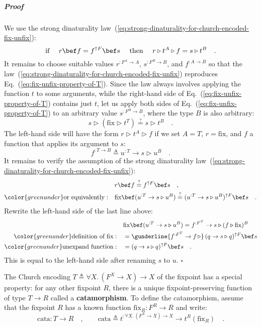 \subparagraph{Proof}

We use the strong dinaturality law~(\ref{eq:strong-dinaturality-for-church-encoded-fix-unfix}):
\[
\text{if }\quad r\bef f=f^{\uparrow F}\bef s\quad\text{ then }\quad r\triangleright t^{A}\triangleright f=s\triangleright t^{B}\quad.
\]
It remains to choose suitable values $r^{:F^{A}\rightarrow A}$, $s^{:F^{B}\rightarrow B}$,
and $f^{:A\rightarrow B}$ so that the law~(\ref{eq:strong-dinaturality-for-church-encoded-fix-unfix})
reproduces Eq.~(\ref{eq:fix-unfix-property-of-T}). Since the law
always involves applying the function $t$ to some arguments, while
the right-hand side of Eq.~(\ref{eq:fix-unfix-property-of-T}) contains
just $t$, let us apply both sides of Eq.~(\ref{eq:fix-unfix-property-of-T})
to an arbitrary value $s^{:F^{B}\rightarrow B}$, where the type $B$
is also arbitrary:
\[
s\triangleright(\text{fix}\triangleright t^{T})\overset{?}{=}s\triangleright t^{B}\quad.
\]
The left-hand side will have the form $r\triangleright t^{A}\triangleright f$
if we set $A=T$, $r=\text{fix}$, and $f$ a function that applies
its argument to $s$:
\[
f^{:T\rightarrow B}\triangleq u^{:T}\rightarrow s\triangleright u^{B}\quad.
\]
It remains to verify the assumption of the strong dinaturality law~(\ref{eq:strong-dinaturality-for-church-encoded-fix-unfix}):
\begin{align*}
 & r\bef f\overset{?}{=}f^{\uparrow F}\bef s\quad,\\
{\color{greenunder}\text{or equivalently}:}\quad & \text{fix}\bef(u^{:T}\rightarrow s\triangleright u^{B})\overset{?}{=}(u^{:T}\rightarrow s\triangleright u^{B})^{\uparrow F}\bef s\quad.
\end{align*}
Rewrite the left-hand side of the last line above:
\begin{align*}
 & \text{fix}\bef(u^{:T}\rightarrow s\triangleright u^{B})=f^{:F^{T}}\rightarrow s\triangleright(f\triangleright\text{fix})^{B}\\
{\color{greenunder}\text{definition of }\text{fix}:}\quad & =\gunderline{f^{:F^{T}}\rightarrow f\,\triangleright}\,(q\rightarrow s\triangleright q)^{\uparrow F}\bef s\\
{\color{greenunder}\text{unexpand function}:}\quad & =(q\rightarrow s\triangleright q)^{\uparrow F}\bef s\quad.
\end{align*}
This is equal to the left-hand side after renaming $s$ to $u$. $\square$

The Church encoding $T\triangleq\forall X.\,(F^{X}\rightarrow X)\rightarrow X$
of the fixpoint has a special property: for any other fixpoint $R$,
there is a unique fixpoint-preserving function of type $T\rightarrow R$
called a \textbf{catamorphism}. To define the
catamorphism, assume that the fixpoint $R$ has a known function $\text{fix}_{R}:F^{R}\rightarrow R$
and write:
\[
\text{cata}:T\rightarrow R\quad,\quad\quad\text{cata}\triangleq t^{:\forall X.\,(F^{X}\rightarrow X)\rightarrow X}\rightarrow t^{R}(\text{fix}_{R})\quad.
\]


